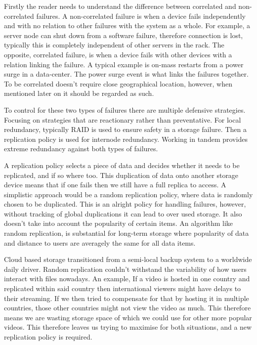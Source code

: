 \documentclass{UoYCSproject}
\begin{document}
Firstly the reader needs to understand the difference between correlated and non-correlated failures.
A non-correlated failure is when a device fails independently and with no relation to other failures with the system as a whole.
For example, a server node can shut down from a software failure, therefore connection is lost, typically this is completely independent of other servers in the rack.
The opposite, correlated failure, is when a device fails with other devices with a relation linking the failure.
A typical example is on-mass restarts from a power surge in a data-center.
The power surge event is what links the failures together.
To be correlated doesn't require close geographical location, however, when mentioned later on it should be regarded as such.

To control for these two types of failures there are multiple defensive strategies.
Focusing on strategies that are reactionary rather than preventative.
For local redundancy, typically RAID is used to ensure safety in a storage failure.
Then a replication policy \cite{Avalability storage} is used for internode redundancy.
Working in tandem provides extreme redundancy against both types of failures.

A replication policy selects a piece of data and decides whether it needs to be replicated, and if so where too. 
This duplication of data onto another storage device means that if one fails then we still have a full replica to access. 
A simplistic approach would be a random replication policy, where data is randomly chosen to be duplicated.
This is an alright policy for handling failures, however, without tracking of global duplications it can lead to over used storage.
It also doesn’t take into account the popularity of certain items.
An algorithm like random replication, is substantial for long-term storage where popularity of data and distance to users are averagely the same for all data items.

Cloud based storage transitioned from a semi-local backup system to a worldwide daily driver.
Random replication couldn’t withstand the variability of how users interact with files nowadays.
An example, If a video is hosted in one country and replicated within said country then international viewers might have delays to their streaming.
If we then tried to compensate for that by hosting it in multiple countries, those other countries might not view the video as much.
This therefore means we are wasting storage space of which we could use for other more popular videos.
This therefore leaves us trying to maximise for both situations, and a new replication policy is required.
\end{document}
